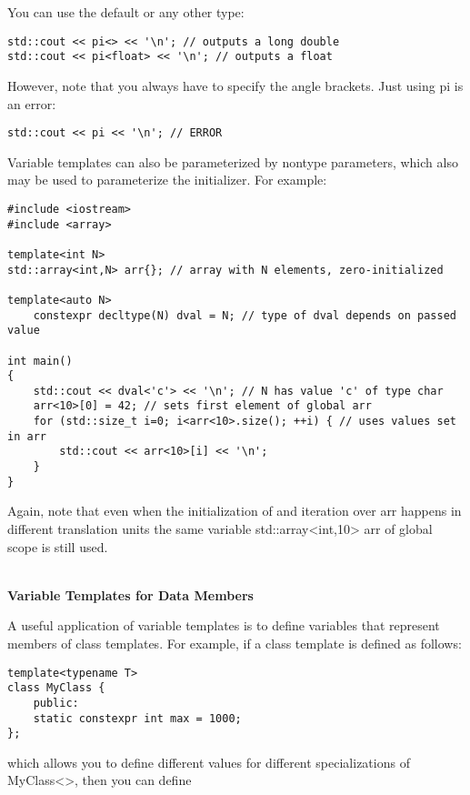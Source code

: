 You can use the default or any other type:

\begin{lstlisting}[style=styleCXX]
std::cout << pi<> << '\n'; // outputs a long double
std::cout << pi<float> << '\n'; // outputs a float
\end{lstlisting}

However, note that you always have to specify the angle brackets. Just using pi is an error:

\begin{lstlisting}[style=styleCXX]
std::cout << pi << '\n'; // ERROR
\end{lstlisting}

Variable templates can also be parameterized by nontype parameters, which also may be used to parameterize the initializer. For example:

\begin{lstlisting}[style=styleCXX]
#include <iostream>
#include <array>

template<int N>
std::array<int,N> arr{}; // array with N elements, zero-initialized

template<auto N>
	constexpr decltype(N) dval = N; // type of dval depends on passed value

int main()
{
	std::cout << dval<'c'> << '\n'; // N has value 'c' of type char
	arr<10>[0] = 42; // sets first element of global arr
	for (std::size_t i=0; i<arr<10>.size(); ++i) { // uses values set in arr
		std::cout << arr<10>[i] << '\n';
	}
}
\end{lstlisting}

Again, note that even when the initialization of and iteration over arr happens in different translation units the same variable std::array<int,10> arr of global scope is still used.

\hspace*{\fill} \\ %
\noindent
\textbf{Variable Templates for Data Members}

A useful application of variable templates is to define variables that represent members of class templates. For example, if a class template is defined as follows:

\begin{lstlisting}[style=styleCXX]
template<typename T>
class MyClass {
	public:
	static constexpr int max = 1000;
};
\end{lstlisting}

which allows you to define different values for different specializations of MyClass<>, then you can define

